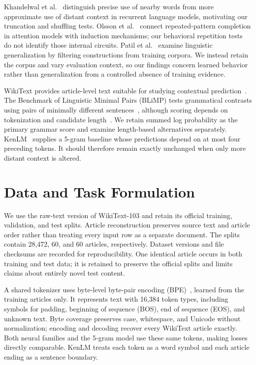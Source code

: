 \documentclass[10pt]{article}
\begin{document}
Khandelwal et al.~\cite{khandelwal2018context} distinguish precise use of nearby words from more approximate use of distant context in recurrent language models, motivating our truncation and shuffling tests. Olsson et al.~\cite{olsson2022induction} connect repeated-pattern completion in attention models with induction mechanisms; our behavioral repetition tests do not identify those internal circuits. Patil et al.~\cite{patil2024fict} examine linguistic generalization by filtering constructions from training corpora. We instead retain the corpus and vary evaluation context, so our findings concern learned behavior rather than generalization from a controlled absence of training evidence.

WikiText provides article-level text suitable for studying contextual prediction~\cite{merity2017pointer}. The Benchmark of Linguistic Minimal Pairs (BLiMP) tests grammatical contrasts using pairs of minimally different sentences~\cite{warstadt2020blimp}, although scoring depends on tokenization and candidate length~\cite{ueda2024length}. We retain summed log probability as the primary grammar score and examine length-based alternatives separately. KenLM~\cite{heafield2011kenlm} supplies a 5-gram baseline whose predictions depend on at most four preceding tokens. It should therefore remain exactly unchanged when only more distant context is altered.

\section{Data and Task Formulation}

We use the raw-text version of WikiText-103 and retain its official training, validation, and test splits. Article reconstruction preserves source text and article order rather than treating every input row as a separate document. The splits contain 28,472, 60, and 60 articles, respectively. Dataset versions and file checksums are recorded for reproducibility. One identical article occurs in both training and test data; it is retained to preserve the official splits and limits claims about entirely novel test content.

A shared tokenizer uses byte-level byte-pair encoding (BPE)~\cite{sennrich2016subword}, learned from the training articles only. It represents text with 16,384 token types, including symbols for padding, beginning of sequence (BOS), end of sequence (EOS), and unknown text. Byte coverage preserves case, whitespace, and Unicode without normalization; encoding and decoding recover every WikiText article exactly. Both neural families and the 5-gram model use these same tokens, making losses directly comparable. KenLM treats each token as a word symbol and each article ending as a sentence boundary.
\end{document}
